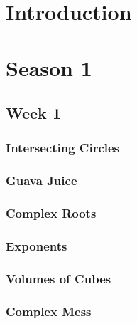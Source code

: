 \documentclass[titlepage=true]{scrartcl}
\begin{document}
\SSfp

\section*{Introduction} 
    
\newpage


\section{Season 1}

    \subsection{Week 1}
        
        \subsubsection{Intersecting Circles}
            \label{1-1-1}
            
        \newpage

        \subsubsection{Guava Juice}
            \label{1-1-2}
            
        \newpage 

        \subsubsection{Complex Roots}
            \label{1-1-3}
            
        \newpage 

        \subsubsection{Exponents}
            \label{1-1-4}
            
        \newpage

        \subsubsection{Volumes of Cubes}
            \label{1-1-5}
            
        \newpage

        \subsubsection{Complex Mess}
            \label{1-1-6}
            
        \newpage 
\end{document}
